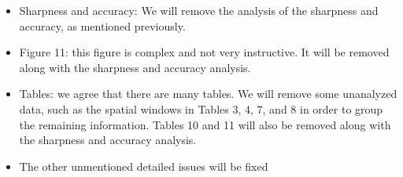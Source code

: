 \documentclass[]{letter}
\begin{document}
\begin{itemize}
	\item Sharpness and accuracy: We will remove the analysis of the sharpness and accuracy, as mentioned previously.
	
	\item Figure 11: this figure is complex and not very instructive. It will be removed along with the sharpness and accuracy analysis.
	
	\item Tables: we agree that there are many tables. We will remove some unanalyzed data, such as the spatial windows in Tables 3, 4, 7, and 8 in order to group the remaining information. Tables 10 and 11 will also be removed along with the sharpness and accuracy analysis.
	
	\item The other unmentioned detailed issues will be fixed
\end{itemize}
\end{document}
